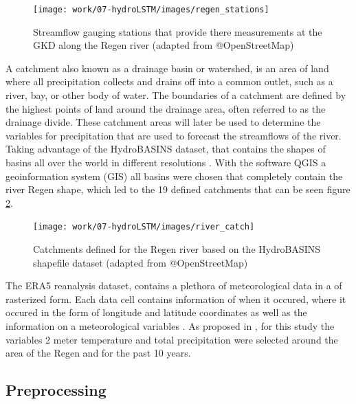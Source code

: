 \documentclass[
]{krantz}
\begin{document}
\begin{figure}

{\centering \texttt{[image: work/07-hydroLSTM/images/regen\_stations]} 

}

\caption{Streamflow gauging stations that provide there measurements at the GKD along the Regen river (adapted from @OpenStreetMap)}\label{fig:regen-shape}
\end{figure}

A catchment also known as a drainage basin or watershed, is an area of land where all precipitation collects and drains off into a common outlet, such as a river, bay, or other body of water. The boundaries of a catchment are defined by the highest points of land around the drainage area, often referred to as the drainage divide. These catchment areas will later be used to determine the variables for precipitation that are used to forecast the streamflows of the river. Taking advantage of the HydroBASINS dataset, that contains the shapes of basins all over the world in different resolutions \citet{lehner}. With the software QGIS a geoinformation system (GIS) all basins were chosen that completely contain the river Regen shape, which led to the 19 defined catchments that can be seen figure \ref{fig:regen-catch}.

\begin{figure}

{\centering \texttt{[image: work/07-hydroLSTM/images/river\_catch]} 

}

\caption{Catchments defined for the Regen river based on the HydroBASINS shapefile dataset (adapted from @OpenStreetMap)}\label{fig:regen-catch}
\end{figure}

The ERA5 reanalysis dataset, contains a plethora of meteorological data in a of rasterized form. Each data cell contains information of when it occured, where it occured in the form of longitude and latitude coordinates as well as the information on a meteorological variables \citet{hersbach2023era5}. As proposed in \citet{sabzipour}, for this study the variables 2 meter temperature and total precipitation were selected around the area of the Regen and for the past 10 years.

\subsection{Preprocessing}\label{preprocessing}
\end{document}
